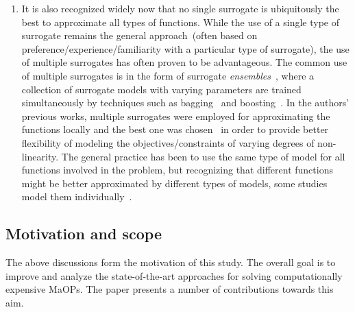 \documentclass[twocolumn,10pt]{asme2ej}
\begin{document}
\begin{enumerate}
\item It is also recognized widely now that no single surrogate is ubiquitously the best to approximate all types of functions. While the use of a single type of surrogate remains the general approach~(often based on preference/experience/familiarity with a particular type of surrogate),  the use of multiple surrogates has often proven to be advantageous. The common use of multiple surrogates is in the form of surrogate \textit{ensembles}~\cite{goel_ensemble_2007,zerpa_optimization_2005, hamza2012co}, where a collection of surrogate models with varying parameters are trained simultaneously by techniques such as bagging~\cite{breiman_bagging_1996} and boosting~\cite{abney_boosting_1999}. In the authors' previous works, multiple surrogates were employed for approximating the functions locally and the best one was chosen~\cite{KHTjmd2016,bhattacharjee2016multiple,KHTisaacs2009multi} in order to provide better flexibility of modeling the objectives/constraints of varying degrees of non-linearity. The general practice has been to use the same type of model for all functions involved in the problem, but recognizing that different functions might be better approximated by different {\color{blue}types} of models, some studies model them individually~\cite{KHTjmd2016,bhattacharjee2016multiple}. 

\end{enumerate}

\subsection{Motivation and scope}

The above discussions form the motivation of this study. The overall goal is to improve and analyze the state-of-the-art approaches for solving computationally expensive MaOPs. The paper presents a number of contributions towards this aim. 
\end{document}
